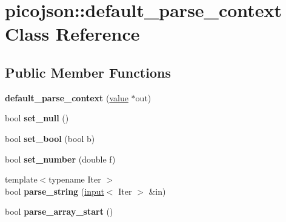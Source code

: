 \hypertarget{classpicojson_1_1default__parse__context}{\section{picojson\+:\+:default\+\_\+parse\+\_\+context Class Reference}
\label{classpicojson_1_1default__parse__context}
}
\subsection*{Public Member Functions}
\begin{DoxyCompactItemize}
\item 
\hypertarget{classpicojson_1_1default__parse__context_ad326572abe85f9d05dc23be4cf76ff3c}{{\bfseries default\+\_\+parse\+\_\+context} (\hyperlink{classpicojson_1_1value}{value} $\ast$out)}\label{classpicojson_1_1default__parse__context_ad326572abe85f9d05dc23be4cf76ff3c}

\item 
\hypertarget{classpicojson_1_1default__parse__context_a2d852ba1f0b115c89378fcb5f10580b5}{bool {\bfseries set\+\_\+null} ()}\label{classpicojson_1_1default__parse__context_a2d852ba1f0b115c89378fcb5f10580b5}

\item 
\hypertarget{classpicojson_1_1default__parse__context_ae1935ef455fc2bed9195426cfee5713a}{bool {\bfseries set\+\_\+bool} (bool b)}\label{classpicojson_1_1default__parse__context_ae1935ef455fc2bed9195426cfee5713a}

\item 
\hypertarget{classpicojson_1_1default__parse__context_a9b2046a9cb6d66aad835b84ffda20b86}{bool {\bfseries set\+\_\+number} (double f)}\label{classpicojson_1_1default__parse__context_a9b2046a9cb6d66aad835b84ffda20b86}

\item 
\hypertarget{classpicojson_1_1default__parse__context_a476c7d30a5cf382b48201ec64585c2f3}{{\footnotesize template$<$typename Iter $>$ }\\bool {\bfseries parse\+\_\+string} (\hyperlink{classpicojson_1_1input}{input}$<$ Iter $>$ \&in)}\label{classpicojson_1_1default__parse__context_a476c7d30a5cf382b48201ec64585c2f3}

\item 
\hypertarget{classpicojson_1_1default__parse__context_a5c355f843ceacde134997f5bbbda1d23}{bool {\bfseries parse\+\_\+array\+\_\+start} ()}\label{classpicojson_1_1default__parse__context_a5c355f843ceacde134997f5bbbda1d23}


\end{DoxyCompactItemize}
